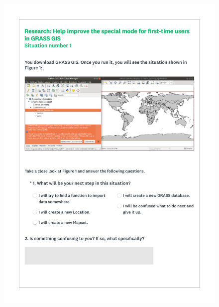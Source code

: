 \documentclass[a4paper,10pt,twoside]{article}
\begin{document}
 \newpage
 \begin{figure}[hbt!]
 \begin{center}
 \includegraphics[width=16cm]{../surveys/questionnaires/survey2-page3_questions1_2.pdf}
 \end{center}
 \end{figure}
 
\end{document}
